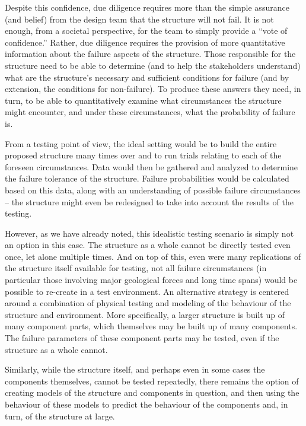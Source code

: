 Despite this confidence, due diligence requires more than the simple assurance (and belief) from the design team that the structure will not fail. It is not enough, from a societal perspective, for the team to simply provide a ``vote of confidence.'' Rather, due diligence requires the provision of more quantitative information about the failure aspects of the structure. Those responsible for the structure need to be able to determine (and to help the stakeholders understand) what are the structure's necessary and sufficient conditions for failure (and by extension, the conditions for non-failure). To produce these answers they need, in turn, to be able to quantitatively examine what circumstances the structure might encounter, and under these circumstances, what the probability of failure is.

From a testing point of view, the ideal setting would be to build the entire proposed structure many times over and to run trials relating to each of the foreseen circumstances. Data would then be gathered and analyzed to determine the failure tolerance of the structure. Failure probabilities would be calculated based on this data, along with an understanding of possible failure circumstances -- the structure might even be redesigned to take into account the results of the testing. 
\par
However, as we have already noted, this idealistic testing scenario is simply not an option in this case. The structure as a whole cannot be directly tested even once, let alone multiple times. And on top of this, even were many replications of the structure itself available for testing, not all failure circumstances (in particular those involving major geological forces and long time spans) would be possible to re-create in a test environment.
\newl
An alternative strategy is centered around a combination of physical testing and modeling of the behaviour of the structure and environment. More specifically, a larger structure is built up of many component parts, which themselves may be built up of many components. The failure parameters of these component parts may be tested, even if the structure as a whole cannot. \par Similarly, while the structure itself, and perhaps even in some cases the components themselves, cannot be tested repeatedly, there remains the option of creating models of the structure and components in question, and then using the behaviour of these models to predict the behaviour of the components and, in turn, of the structure at large.
\newl
